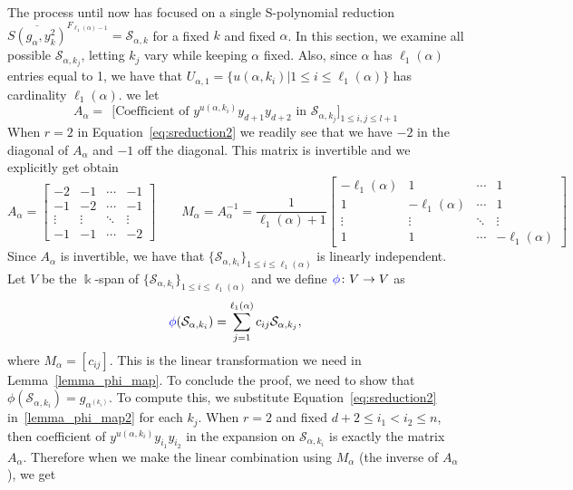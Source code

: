 \documentclass[12pt,reqno]{amsart}
\newcommand{\blue}[1]{\textcolor{blue}{#1}}
\theoremstyle{plain}
\theoremstyle{definition}
\def\field{\Bbbk}
\begin{document}
The process until now has focused on a single S-polynomial reduction $\overline{S(g_\alpha, y_k^2)}^{F_{\ell_1(\alpha)-1}} =\mathcal{S}_{\alpha, k} $ for a fixed $k$ and fixed $\alpha$. In this section, we examine all possible $\mathcal{S}_{\alpha, k_{j}}$, letting $k_j$ vary while keeping $\alpha$ fixed. Also, since $\alpha$ has $\ell_1(\alpha)$ entries equal to 1, we have that $U_{\alpha, 1}=\big\{u(\alpha,k_i)\big| 1\le i\le \ell_1(\alpha)\big\}$ has cardinality $\ell_1(\alpha)$. we let
   $$A_\alpha = \ \  \Big[ \text{Coefficient of } y^{u(\alpha, k_i)}y_{d+1}y_{d+2} \text{ in } \mathcal{S}_{\alpha,k_j} \Big]_{1 \leq i,j \leq l+1}$$
When $r=2$ in Equation~\eqref{eq:sreduction2} we readily see that we have $-2$ in the diagonal of $A_\alpha$ and $-1$ off the  diagonal. 
This matrix is invertible and we explicitly get obtain
$$
    A_\alpha  =  
    \begin{bmatrix} -2 & -1 & \cdots  & -1 \\-1 & -2 &  \cdots & -1 \\  \vdots & \vdots & \ddots  & \vdots \\ -1 & -1 & \cdots & -2 \end{bmatrix}
    \qquad
    M_\alpha =A_\alpha^{-1}  = \frac{1}{\ell_1(\alpha)+1} 
    \begin{bmatrix} -\ell_1(\alpha) & 1 & \cdots  & 1 \\1 & -\ell_1(\alpha)& \cdots & 1 \\ \vdots & \vdots  & \ddots & \vdots \\ 1 & 1 & \cdots  & -\ell_1(\alpha)  \end{bmatrix}
$$
Since $A_\alpha$ is invertible, we have that $\{\mathcal{S}_{\alpha, k_i}\}_{1 \leq i \leq \ell_1(\alpha)}$ is linearly independent. Let $V$ be the $\field$-span of $\{\mathcal{S}_{\alpha, k_i}\}_{1 \leq i \leq \ell_1(\alpha)}$ and we define $\blue{\phi}\colon V \to  V$ as 
\begin{equation} \label{lemma_phi_map2}
    \blue{\phi} (\mathcal{S}_{\alpha, k_i}) = \sum_{j=1}^{\ell_1(\alpha)} c_{ij} \mathcal{S}_{\alpha, {k_{j}}},
\end{equation}
where $M_\alpha=[c_{ij}]$. This is the linear transformation we need in  Lemma~\ref{lemma_phi_map}. To conclude the proof, we need to show that  $\phi(\mathcal{S}_{\alpha, k_i})  = g_{\alpha^{(k_i)}}$. To compute this, we substitute Equation~\eqref{eq:sreduction2} in~\eqref{lemma_phi_map2} for each $k_j$. When $r=2$ and fixed $d+2 \leq i_1 < i_2 \leq n$, then coefficient of 
$y^{u(\alpha, k_i)} y_{i_1} y_{i_2}$ in the expansion on $\mathcal{S}_{\alpha, k_i}$ is exactly the matrix $A_\alpha$. Therefore when we make the linear combination using $M_\alpha$ (the  inverse of $A_\alpha$), we get
\end{document}
